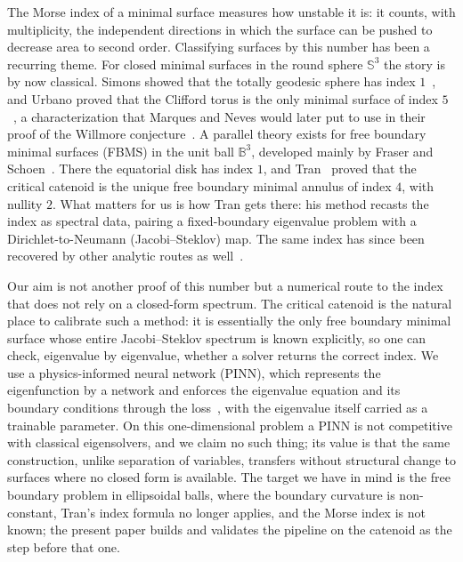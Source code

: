\documentclass[11pt]{article}
\theoremstyle{definition}
\theoremstyle{plain}
\begin{document}
The Morse index of a minimal surface measures how unstable it is: it counts, with multiplicity, the independent directions in which the surface can be pushed to decrease area to second order. Classifying surfaces by this number has been a recurring theme. For closed minimal surfaces in the round sphere $\mathbb{S}^3$ the story is by now classical. Simons showed that the totally geodesic sphere has index $1$~\cite{simons01}, and Urbano proved that the Clifford torus is the only minimal surface of index $5$~\cite{urbano01}, a characterization that Marques and Neves would later put to use in their proof of the Willmore conjecture~\cite{marquesneves01}. A parallel theory exists for free boundary minimal surfaces (FBMS) in the unit ball $\mathbb{B}^3$, developed mainly by Fraser and Schoen~\cite{fraser01, fraser05}. There the equatorial disk has index $1$, and Tran~\cite[Theorem 1.3]{tran01} proved that the critical catenoid is the unique free boundary minimal annulus of index $4$, with nullity $2$. What matters for us is how Tran gets there: his method recasts the index as spectral data, pairing a fixed-boundary eigenvalue problem with a Dirichlet-to-Neumann (Jacobi--Steklov) map. The same index has since been recovered by other analytic routes as well~\cite{devyver01, smithzhou01}.

Our aim is not another proof of this number but a numerical route to the index that does not rely on a closed-form spectrum. The critical catenoid is the natural place to calibrate such a method: it is essentially the only free boundary minimal surface whose entire Jacobi--Steklov spectrum is known explicitly, so one can check, eigenvalue by eigenvalue, whether a solver returns the correct index. We use a physics-informed neural network (PINN), which represents the eigenfunction by a network and enforces the eigenvalue equation and its boundary conditions through the loss~\cite{raissi01}, with the eigenvalue itself carried as a trainable parameter. On this one-dimensional problem a PINN is not competitive with classical eigensolvers, and we claim no such thing; its value is that the same construction, unlike separation of variables, transfers without structural change to surfaces where no closed form is available. The target we have in mind is the free boundary problem in ellipsoidal balls, where the boundary curvature is non-constant, Tran's index formula no longer applies, and the Morse index is not known; the present paper builds and validates the pipeline on the catenoid as the step before that one.
\end{document}
